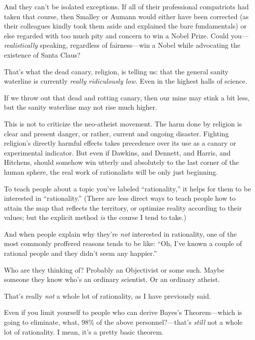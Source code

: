 {
 And they can't be isolated exceptions. If all of
their professional compatriots had taken that course, then Smalley or
Aumann would either have been corrected (as their colleagues kindly
took them aside and explained the bare fundamentals) or else regarded
with too much pity and concern to win a Nobel Prize. Could
you---\textit{realistically} speaking, regardless of fairness---win a
Nobel while advocating the existence of Santa Claus?}

{
 That's what the dead canary, religion, is telling
us: that the general sanity waterline is currently \textit{really
ridiculously low.} Even in the highest halls of science.}

{
 If we throw out that dead and rotting canary, then our mine may
stink a bit less, but the sanity waterline may not rise much higher.}

{
 This is not to criticize the neo-atheist movement. The harm done
by religion is clear and present danger, or rather, current and ongoing
disaster. Fighting religion's directly harmful effects
takes precedence over its use as a canary or experimental indicator.
But even if Dawkins, and Dennett, and Harris, and Hitchens, should
somehow win utterly and absolutely to the last corner of the human
sphere, the real work of rationalists will be only just beginning.}

\myendsectiontext


{
 To teach people about a topic you've labeled
``rationality,'' it helps for them
to be interested in ``rationality.''
(There are less direct ways to teach people how to attain the map that
reflects the territory, or optimize reality according to their values;
but the explicit method \textit{is} the course I tend to take.) }

{
 And when people explain why they're \textit{not}
interested in rationality, one of the most commonly proffered reasons
tends to be like: ``Oh, I've known a
couple of rational people and they didn't seem any
happier.''}

{
 Who are they thinking of? Probably an Objectivist or some such.
Maybe someone they know who's an ordinary scientist. Or
an ordinary atheist.}

{
 That's really \textit{not} a whole lot of
rationality, as I have previously said.}

{
 Even if you limit yourself to people who can derive
Bayes's Theorem---which is going to eliminate, what,
98\% of the above personnel?---that's \textit{still}
not a whole lot of rationality. I mean, it's a pretty
basic theorem.}

